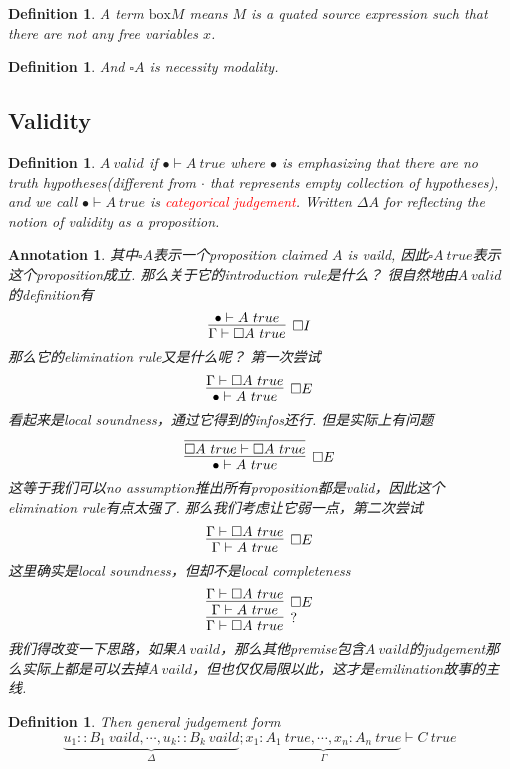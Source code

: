\documentclass{article}
\theoremstyle{plain}
\newtheorem{definition}[theorem]{Definition}
\newtheorem{annotation}[theorem]{Annotation}
\theoremstyle{nonumberplain}
\newcommand{\redt}[1]{\textcolor{red}{#1}}
\begin{document}
\begin{definition}
\rm A term $\text{box} M$ means $M$ is a quated source expression such that there are not any free variables $x$. 
\end{definition}


\begin{definition}
\rm And $\square A$ is necessity modality. 
\end{definition}


\subsection{Validity}

\begin{definition}
\rm $A~valid$ if $\bullet \vdash A~true$ where $\bullet$ is emphasizing that there are no truth hypotheses(different from $\cdot$ that represents empty collection of hypotheses), and we call $\bullet \vdash A~true$ is \redt{categorical judgement}. Written $\Delta A$ for reflecting the notion of validity as a proposition. 
\end{definition}

\begin{annotation}
\rm 其中$\square A$表示一个proposition claimed $A$ is vaild, 因此$\square A ~true$表示这个proposition成立. 那么关于它的introduction rule是什么？ 很自然地由$A ~ valid$的definition有
$$
\infer[\square I]{\Gamma \vdash \square A~true}{\bullet \vdash A~true}
$$
那么它的elimination rule又是什么呢？ 第一次尝试
$$
\infer[\square E]{\bullet \vdash A~true}{\Gamma \vdash \square A~true}
$$
看起来是local soundness，通过它得到的infos还行. 但是实际上有问题
$$
\infer[\square E]{\bullet \vdash A~true}{\infer{\square A~true \vdash \square A~true}{}}
$$
这等于我们可以no assumption推出所有proposition都是valid，因此这个elimination rule有点太强了. 那么我们考虑让它弱一点，第二次尝试
$$
\infer[\square E]{\Gamma \vdash A~true}{\Gamma \vdash \square A~true}
$$
这里确实是local soundness，但却不是local completeness
$$
\infer[?]{\Gamma \vdash \square A~true}{\infer[\square E]{\Gamma \vdash A~true}{\Gamma \vdash \square A~true}}
$$
我们得改变一下思路，如果$A~vaild$，那么其他premise包含$A~vaild$的judgement那么实际上都是可以去掉$A~vaild$，但也仅仅局限以此，这才是emilination故事的主线. 
\end{annotation}

\begin{definition}
\rm Then general judgement form
$$
\underbrace{u_1::B_1~vaild,\cdots,u_k::B_k~vaild}_{\Delta}; \underbrace{x_1:A_1~true,\cdots,x_n:A_n~true}_{\Gamma} \vdash C~true
$$
\end{definition}
\end{document}
